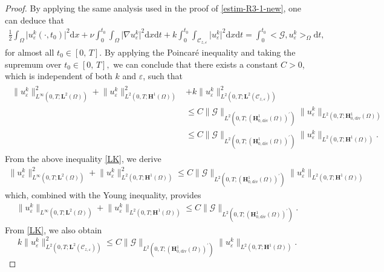 \documentclass[a4paper,12pt,reqno,natbib]{amsart}
\newcommand{\dx} {\displaystyle\mathrm{d}x}
\newcommand{\dt} {\displaystyle\mathrm{d}t}
\def\H{\textbf{H}}
\def\L{\textbf{L}}
\def\div{\text{div}}
\begin{document}
\begin{proof}
By applying the same analysis used in the proof of \eqref{estim-R3-1-new}, one can deduce that 
\begin{align*}
    \frac{1}{2}\int_\Omega \big|u_\varepsilon^k(\cdot,t_0)\big|^2\dx+\nu\int_0^{t_0}\int_\Omega\big|\nabla u_\varepsilon^k\big|^2\dx\dt+k\int_0^{t_0}\int_{\mathcal{C}_{z,\varepsilon}}\big|u_\varepsilon^k\big|^2\dx\dt=\int_0^{t_0}\big<\mathcal{G}, u_\varepsilon^k\big>_\Omega\dt,
\end{align*}  
for almost all $t_0\in[0,\,T].$ By applying the Poincaré inequality and taking the supremum over $t_0\in[0,\,T],$ we can conclude that there exists a constant $C>0$, which is independent of both $k$ and $\varepsilon$, such that
\begin{align}
\begin{split}\label{LK}
\big\|u_\varepsilon^k\big\|^2_{L^\infty(0,T;\L^2(\Omega))}+\big\|u_\varepsilon^k\big\|^2_{L^2(0,T;\H^1(\Omega))}&+k\big\|u_\varepsilon^k\big\|^2_{L^2(0,T;\L^2(\mathcal{C}_{z,\varepsilon}))}\\
&\leq C\big\|\mathcal{G}\big\|_{L^2(0,T;(\H^1_{0,\div}(\Omega))^\prime)}\big\|u_\varepsilon^k\big\|_{L^2(0,T;\H^1_{0,\div}(\Omega))}\\
&\leq C\big\|\mathcal{G}\big\|_{L^2(0,T;(\H^1_{0,\div}(\Omega))^\prime)}\big\|u_\varepsilon^k\big\|_{L^2(0,T;\H^1(\Omega))}.
\end{split}
\end{align} 
From the above inequality \eqref{LK}, we derive
\begin{align*}
\big\|u_\varepsilon^k\big\|^2_{L^\infty(0,T;\L^2(\Omega))}+\big\|u_\varepsilon^k\big\|^2_{L^2(0,T;\H^1(\Omega))}\leq C\big\|\mathcal{G}\big\|_{L^2(0,T;(\H^1_{0,\div}(\Omega))^\prime)}\big\|u_\varepsilon^k\big\|_{L^2(0,T;\H^1(\Omega))}
\end{align*}
which, combined with the Young inequality, provides
\begin{align}\label{LKK}
\big\|u_\varepsilon^k\big\|_{L^\infty(0,T;\L^2(\Omega))}+\big\|u_\varepsilon^k\big\|_{L^2(0,T;\H^1(\Omega))}\leq C\big\|\mathcal{G}\big\|_{L^2(0,T;(\H^1_{0,\div}(\Omega))^\prime)}.
\end{align}
From \eqref{LK}, we also obtain
\begin{equation}
k\big\|u_\varepsilon^k\big\|^2_{L^2(0,T;\L^2(\mathcal{C}_{z,\varepsilon}))}\leq C\big\|\mathcal{G}\big\|_{L^2(0,T;(\H^1_{0,\div}(\Omega))^\prime)}\big\|u_\varepsilon^k\big\|_{L^2(0,T;\H^1(\Omega))}.
\end{equation}

\end{proof}
\end{document}
